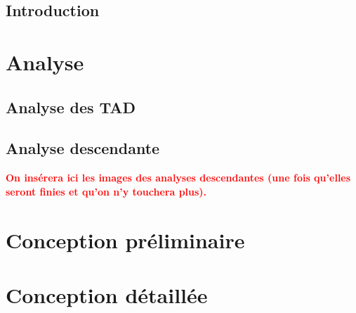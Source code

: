 \documentclass[11pt]{report}
\begin{document}
\thispagestyle{empty}
\clearpage\mbox{}\clearpage

\thispagestyle{plain}
\chapter*{Introduction}

\tableofcontents

\part{Analyse}
\chapter{Analyse des TAD}


\chapter{Analyse descendante}
 {\huge \textbf{ \textcolor{red}{On insérera ici les images des analyses descendantes (une fois qu'elles seront finies et qu'on n'y touchera plus).}} }

\setcounter{chapter}{0}
\part{Conception préliminaire}


\setcounter{chapter}{0}
\part{Conception détaillée}


\setcounter{chapter}{0}
\end{document}
